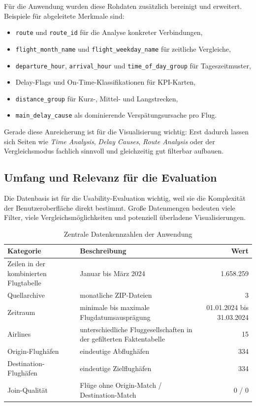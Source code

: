 \documentclass[11pt,a4paper]{article}
\begin{document}
Für die Anwendung wurden diese Rohdaten zusätzlich bereinigt und erweitert. Beispiele für abgeleitete Merkmale sind:

\begin{itemize}[leftmargin=1.2cm]
\item \texttt{route} und \texttt{route\_id} für die Analyse konkreter Verbindungen,
\item \texttt{flight\_month\_name} und \texttt{flight\_weekday\_name} für zeitliche Vergleiche,
\item \texttt{departure\_hour}, \texttt{arrival\_hour} und \texttt{time\_of\_day\_group} für Tageszeitmuster,
\item Delay-Flags und On-Time-Klassifikationen für KPI-Karten,
\item \texttt{distance\_group} für Kurz-, Mittel- und Langstrecken,
\item \texttt{main\_delay\_cause} als dominierende Verspätungsursache pro Flug.
\end{itemize}

Gerade diese Anreicherung ist für die Visualisierung wichtig: Erst dadurch lassen sich Seiten wie \textit{Time Analysis}, \textit{Delay Causes}, \textit{Route Analysis} oder der Vergleichsmodus fachlich sinnvoll und gleichzeitig gut filterbar aufbauen.

\subsection{Umfang und Relevanz für die Evaluation}
Die Datenbasis ist für die Usability-Evaluation wichtig, weil sie die Komplexität der Benutzeroberfläche direkt bestimmt. Große Datenmengen bedeuten viele Filter, viele Vergleichsmöglichkeiten und potenziell überladene Visualisierungen.

\begin{table}[H]
\centering
\caption{Zentrale Datenkennzahlen der Anwendung}
\begin{tabularx}{\textwidth}{lXr}
\toprule
\textbf{Kategorie} & \textbf{Beschreibung} & \textbf{Wert} \\
\midrule
Zeilen in der kombinierten Flugtabelle & Januar bis März 2024 & 1.658.259 \\
Quellarchive & monatliche ZIP-Dateien & 3 \\
Zeitraum & minimale bis maximale Flugdatumsausprägung & 01.01.2024 bis 31.03.2024 \\
Airlines & unterschiedliche Fluggesellschaften in der gefilterten Faktentabelle & 15 \\
Origin-Flughäfen & eindeutige Abflughäfen & 334 \\
Destination-Flughäfen & eindeutige Zielflughäfen & 334 \\
Join-Qualität & Flüge ohne Origin-Match / Destination-Match & 0 / 0 \\
\bottomrule
\end{tabularx}
\end{table}
\end{document}
